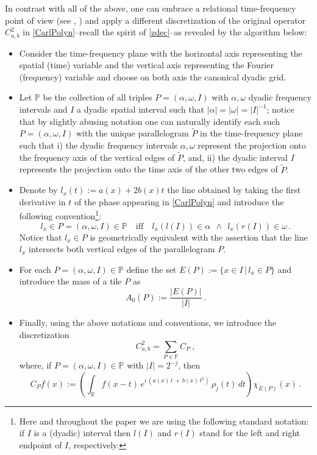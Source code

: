 \documentclass[a4paper,reqno]{amsart}
\numberwithin{equation}{section}
\theoremstyle{definition}
\newcommand{\R}{\mathbb{R}}
\renewcommand{\P}{\mathbb{P}}
\def\a{\alpha}
\def\o{\omega}
\begin{document}
In contrast with all of the above, one can embrace a relational time-frequency point of view (see \cite{Lie09},\cite{Lie09Thesis} \cite{Lie20}) and apply a different discretization of the original operator $C_{a,b}^{2}$ in \eqref{CarlPolyn}--recall the spirit of \eqref{zdec}--as revealed by the algorithm below:
\begin{itemize}
\item Consider the time-frequency plane with the horizontal axis representing the spatial (time) variable and  the vertical axis representing the Fourier (frequency) variable and choose on both axis the canonical dyadic grid.
\item Let $\P$ be the collection of all triples $P=(\a,\o, I)$ with $\a, \o$ dyadic frequency intervals and $I$ a dyadic spatial interval such that $|\a|=|\o|=|I|^{-1}$; notice that by slightly abusing notation one can naturally identify each such $P=(\a,\o,I)$ with the unique parallelogram $\tilde{P}$ in the time-frequency plane such that i) the dyadic frequency intervals $\a, \o$  represent the projection onto the frequency axis of the vertical edges of $\tilde{P}$, and, ii) the dyadic interval $I$ represents the projection onto the time axis of the other two edges of $\tilde{P}$.
\item Denote by $l_x(t):=a(x)+2 b(x) t$ the line obtained by taking the first derivative in $t$ of the phase appearing in \eqref{CarlPolyn} and introduce the following convention\footnote{Here and throughout the paper we are using the following standard notation: if $I$ is a (dyadic) interval then $l(I)$ and $r(I)$ stand for the left and right endpoint of $I$, respectively.}:
\begin{equation}\label{lineP}
l_x\in P=(\a,\o, I)\in\P\quad\textrm{iff}\quad l_x(l(I))\in \a\:\:\wedge\:\:l_x(r(I))\in\o\,.
\end{equation}
Notice that $l_x\in P$ is geometrically equivalent with the assertion that the line $l_x$ intersects both vertical edges of the parallelogram $P$.
\item For each $P=(\a,\o, I)\in\P$ define the set $E(P):=\{x\in I\,|\,l_x\in P\}$ and introduce the mass of a tile $P$ as
\begin{equation}\label{massP}
A_0(P):=\frac{|E(P)|}{|I|}\,.
\end{equation}
\item Finally, using the above notations and conventions, we introduce the discretization
\begin{equation}\label{zdecquad}
		C_{a,b}^{2}=\sum_{P\in\P} C_{P}\:,
\end{equation}
where, if $P=(\a,\o, I)\in\P$ with $|I|=2^{-j}$, then
\begin{equation}\label{zdecquad1}
		C_{P}f(x):=\left(\int_{\R} f(x-t)\,e^{i\,(a(x)\,t\,+\,b(x)\,t^{2})}\,\rho_j(t)\,dt\right)\chi_{E(P)}(x)\,.
\end{equation}
\end{itemize}
\end{document}
